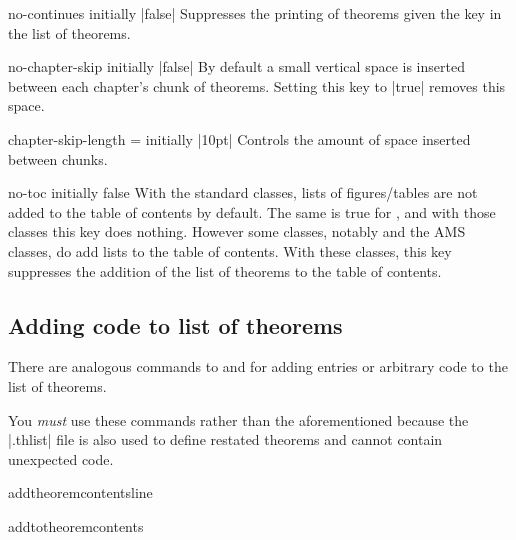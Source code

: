 \documentclass{ltxdoc}
\begin{document}
\begin{docKey}{no-continues}
  {}
  {initially |false|}
Suppresses the printing of theorems given the  key in the list of theorems.
\end{docKey}

\begin{docKey}{no-chapter-skip}
  {}
  {initially |false|}
By default a small vertical space is inserted between each chapter's chunk of theorems.
Setting this key to |true| removes this space.
\end{docKey}

\begin{docKey}{chapter-skip-length}
  {=}
  {initially |10pt|}
Controls the amount of space inserted between chunks.
\end{docKey}

\begin{docKey}{no-toc}
  {}
  {initially false}
With the standard classes, lists of figures/tables are not added to the table of contents by default. The same is true for , and with those classes this key does nothing. However some classes, notably  and the AMS classes, do add lists to the table of contents. With these classes, this key suppresses the addition of the list of theorems to the table of contents.
\end{docKey}

\subsection{Adding code to list of theorems}

There are analogous commands to  and  for adding entries or arbitrary code to the list of theorems.

\begin{notebox}
You \emph{must} use these commands rather than the aforementioned because the |.thlist| file is also used to define restated theorems and cannot contain unexpected code.
\end{notebox}

\begin{docCommand}{addtheoremcontentsline}
  {}

\end{docCommand}

\begin{docCommand}{addtotheoremcontents}
  {}

\end{docCommand}
\end{document}
